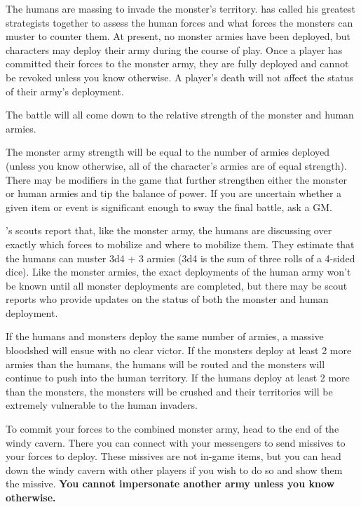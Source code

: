 \documentclass[green]{guildcamp2}
\begin{document}
\name{\gBattle{}}

The humans are massing to invade the monster's territory. \cOnyx{} has called his greatest strategists together to assess the human forces and what forces the monsters can muster to counter them. At present, no monster armies have been deployed, but characters may deploy their army during the course of play. Once a player has committed their forces to the monster army, they are fully deployed and cannot be revoked unless you know otherwise. A player's death will not affect the status of their army's deployment.

The battle will all come down to the relative strength of the monster and human armies.

The monster army strength will be equal to the number of armies deployed (unless you know otherwise, all of the character's armies are of equal strength). There may be modifiers in the game that further strengthen either the monster or human armies and tip the balance of power. If you are uncertain whether a given item or event is significant enough to sway the final battle, ask a GM.

\cOnyx{}'s scouts report that, like the monster army, the humans are discussing over exactly which forces to mobilize and where to mobilize them. They estimate that the humans can muster 3d4 + 3 armies (3d4 is the sum of three rolls of a 4-sided dice). Like the monster armies, the exact deployments of the human army won't be known until all monster deployments are completed, but there may be scout reports who provide updates on the status of both the monster and human deployment.

If the humans and monsters deploy the same number of armies, a massive bloodshed will ensue with no clear victor. If the monsters deploy at least 2 more armies than the humans, the humans will be routed and the monsters will continue to push into the human territory. If the humans deploy at least 2 more than the monsters, the monsters will be crushed and their territories will be extremely vulnerable to the human invaders.

To commit your forces to the combined monster army, head to the end of the windy cavern. There you can connect with your messengers to send missives to your forces to deploy. These missives are not in-game items, but you can head down the windy cavern with other players if you wish to do so and show them the missive. \textbf{You cannot impersonate another army unless you know otherwise.}
\end{document}
